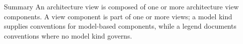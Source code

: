\documentclass[10pt,letterpaper]{article}
\begin{document}
\begin{CornellSummaryBox}{Summary}
An architecture view is composed of one or more architecture view components. A view component is part of one or more views; a model kind supplies conventions for model-based components, while a legend documents conventions where no model kind governs.
\end{CornellSummaryBox}
\end{document}
